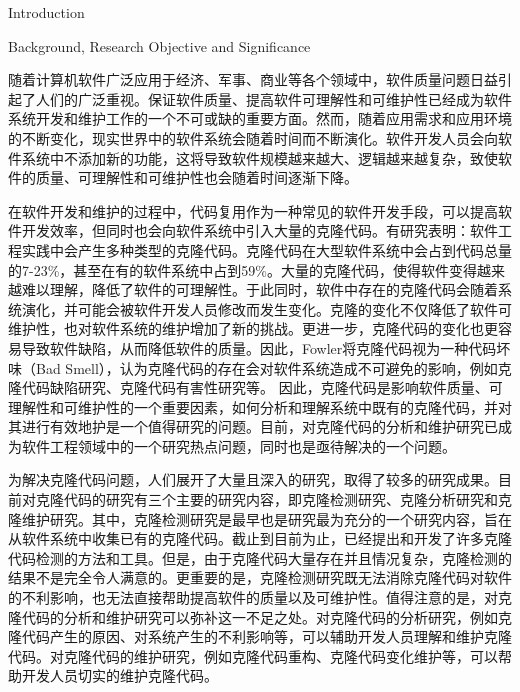 
{Introduction}

{Background, Research Objective and Significance}

随着计算机软件广泛应用于经济、军事、商业等各个领域中，软件质量问题日益引起了人们的广泛重视。保证软件质量、提高软件可理解性和可维护性已经成为软件系统开发和维护工作的一个不可或缺的重要方面。然而，随着应用需求和应用环境的不断变化，现实世界中的软件系统会随着时间而不断演化。软件开发人员会向软件系统中不添加新的功能，这将导致软件规模越来越大、逻辑越来越复杂，致使软件的质量、可理解性和可维护性也会随着时间逐渐下降。

在软件开发和维护的过程中，代码复用作为一种常见的软件开发手段，可以提高软件开发效率，但同时也会向软件系统中引入大量的克隆代码。有研究表明：软件工程实践中会产生多种类型的克隆代码\cite{roy2007survey}。克隆代码在大型软件系统中会占到代码总量的7-23\%\cite{baker1995finding}\cite{kontogiannis1996pattern}\cite{lague1997assessing}，甚至在有的软件系统中占到59\%\cite{ducasse1999language}。大量的克隆代码，使得软件变得越来越难以理解，降低了软件的可理解性。于此同时，软件中存在的克隆代码会随着系统演化，并可能会被软件开发人员修改而发生变化。克隆的变化不仅降低了软件可维护性，也对软件系统的维护增加了新的挑战。更进一步，克隆代码的变化也更容易导致软件缺陷，从而降低软件的质量。因此，Fowler将克隆代码视为一种代码坏味（Bad Smell）\cite{fowler2009refactoring}，认为克隆代码的存在会对软件系统造成不可避免的影响，例如克隆代码缺陷研究\cite{juergens2009code}\cite{gauthier2013uncovering}\cite{wagner2016relationship}、克隆代码有害性研究\cite{kapser2008cloning}\cite{selim2010studying}\cite{wang2012can}等。
因此，克隆代码是影响软件质量、可理解性和可维护性的一个重要因素，如何分析和理解系统中既有的克隆代码，并对其进行有效地护是一个值得研究的问题。目前，对克隆代码的分析和维护研究已成为软件工程领域中的一个研究热点问题，同时也是亟待解决的一个问题。

为解决克隆代码问题，人们展开了大量且深入的研究，取得了较多的研究成果。目前对克隆代码的研究有三个主要的研究内容，即克隆检测研究、克隆分析研究和克隆维护研究。其中，克隆检测研究是最早也是研究最为充分的一个研究内容，旨在从软件系统中收集已有的克隆代码。截止到目前为止，已经提出和开发了许多克隆代码检测的方法和工具\cite{roy2008nicad}\cite{kamiya2002ccfinder}\cite{jiang2007deckard}。但是，由于克隆代码大量存在并且情况复杂，克隆检测的结果不是完全令人满意的。更重要的是，克隆检测研究既无法消除克隆代码对软件的不利影响，也无法直接帮助提高软件的质量以及可维护性。值得注意的是，对克隆代码的分析和维护研究可以弥补这一不足之处。对克隆代码的分析研究，例如克隆代码产生的原因、对系统产生的不利影响等，可以辅助开发人员理解和维护克隆代码。对克隆代码的维护研究，例如克隆代码重构、克隆代码变化维护等，可以帮助开发人员切实的维护克隆代码。

